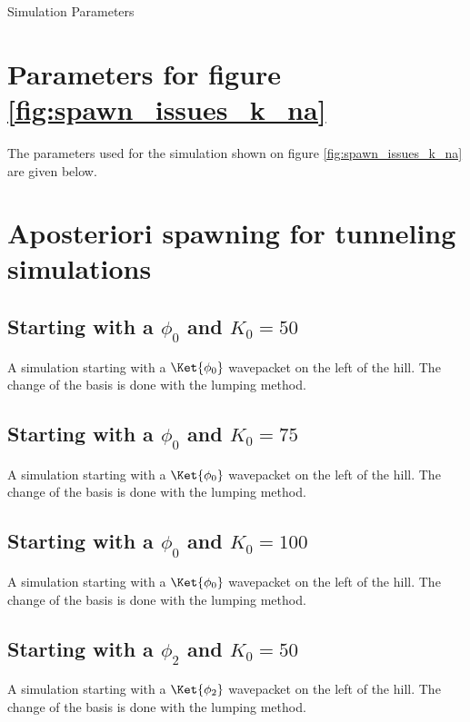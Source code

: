 \begin{chapter}{Simulation Parameters}
\FloatBarrier
\section{Parameters for figure \ref{fig:spawn_issues_k_na}}

The parameters used for the simulation shown on figure \ref{fig:spawn_issues_k_na}
are given below.



\FloatBarrier
\section{Aposteriori spawning for tunneling simulations}
\label{cfg:eckart_apost}

\subsection{Starting with a $\phi_0$ and $K_0=50$}
\label{cfg:eckart_phi0_K050}
A simulation starting with a $\Ket{\phi_0}$ wavepacket on the left of the hill.
The change of the basis is done with the lumping method.

\subsection{Starting with a $\phi_0$ and $K_0=75$}
\label{cfg:eckart_phi0_K075}
A simulation starting with a $\Ket{\phi_0}$ wavepacket on the left of the hill.
The change of the basis is done with the lumping method.

\subsection{Starting with a $\phi_0$ and $K_0=100$}
\label{cfg:eckart_phi0_K0100}
A simulation starting with a $\Ket{\phi_0}$ wavepacket on the left of the hill.
The change of the basis is done with the lumping method.

\subsection{Starting with a $\phi_2$ and $K_0=50$}
\label{cfg:eckart_phi2_K050}
A simulation starting with a $\Ket{\phi_2}$ wavepacket on the left of the hill.
The change of the basis is done with the lumping method.


\end{chapter}
